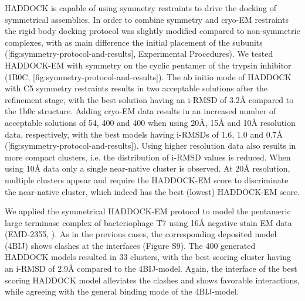HADDOCK is capable of using symmetry restraints to drive the docking of symmetrical assemblies. 
In order to combine symmetry and cryo-EM restraints the rigid body docking protocol was slightly modified compared to non-symmetric complexes, with as main difference the initial placement of the subunits ([fig:symmetry-protocol-and-results], Experimental Procedures). 
We tested HADDOCK-EM with symmetry on the cyclic pentamer of the trypsin inhibitor (1B0C, [fig:symmetry-protocol-and-results]). 
The ab initio mode of HADDOCK with C5 symmetry restraints results in two acceptable solutions after the refinement stage, with the best solution having an i-RMSD of 3.2Å compared to the 1b0c structure. 
Adding cryo-EM data results in an increased number of acceptable solutions of 54, 400 and 400 when using 20Å, 15Å and 10Å resolution data, respectively, with the best models having i-RMSDs of 1.6, 1.0 and 0.7Å ([fig:symmetry-protocol-and-results]). 
Using higher resolution data also results in more compact clusters, i.e. the distribution of i-RMSD values is reduced. 
When using 10Å data only a single near-native cluster is observed. At 20Å resolution, multiple clusters appear and require the HADDOCK-EM score to discriminate the near-native cluster, which indeed has the best (lowest) HADDOCK-EM score. 

We applied the symmetrical HADDOCK-EM protocol to model the pentameric large terminase complex of bacteriophage T7 using 16Å negative stain EM data (EMD-2355, \inlinecite[Dauden2013]).
As in the previous cases, the corresponding deposited model (4BIJ) shows clashes at the interfaces (Figure S9). 
The 400 generated HADDOCK models resulted in 33 clusters, with the best scoring cluster having an i-RMSD of 2.9Å compared to the 4BIJ-model. 
Again, the interface of the best scoring HADDOCK model alleviates the clashes and shows favorable interactions, while agreeing with the general binding mode of the 4BIJ-model.
